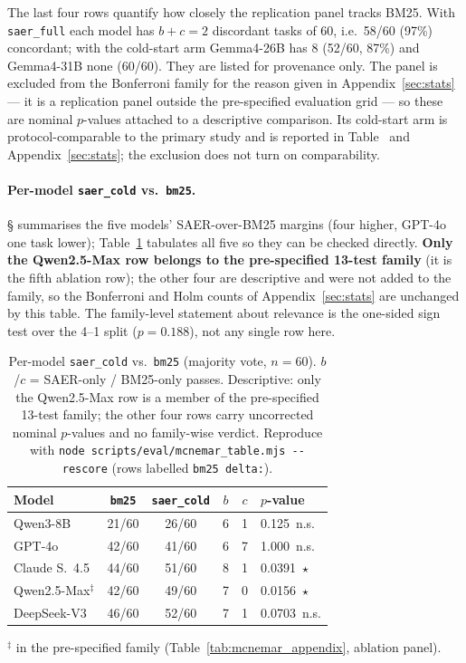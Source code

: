 \documentclass[letterpaper]{article} %
\newcommand{\appref}[1]{Appendix~\ref{#1}}
\newcommand{\bodyref}[1]{\getrefnumber{#1}}
\begin{document}
The last four rows quantify how closely the replication panel tracks
BM25.  With \texttt{saer\_full} each model has $b{+}c{=}2$ discordant
tasks of 60, i.e.\ 58/60 (97\%) concordant; with the cold-start arm
Gemma4-26B has 8 (52/60, 87\%) and Gemma4-31B none (60/60).
They are listed for provenance only.  The panel is excluded from the
Bonferroni family for the reason given in \appref{sec:stats} --- it is a
replication panel outside the pre-specified evaluation grid --- so these
are nominal $p$-values attached to a descriptive comparison.  Its
cold-start arm is protocol-comparable to the primary study and is
reported in Table~\bodyref{tab:main} and \appref{sec:stats}; the exclusion
does not turn on comparability.

\paragraph{Per-model \texttt{saer\_cold} vs.\ \texttt{bm25}.}
\S\bodyref{sec:ablation} summarises the five models' SAER-over-BM25 margins
(four higher, GPT-4o one task lower); Table~\ref{tab:bm25_permodel} tabulates all five so they can be
checked directly.  \textbf{Only the Qwen2.5-Max row belongs to the
pre-specified 13-test family} (it is the fifth ablation row); the other
four are descriptive and were not added to the family, so the Bonferroni
and Holm counts of \appref{sec:stats} are unchanged by this table.  The
family-level statement about relevance is the one-sided sign test over
the 4--1 split ($p{=}0.188$), not any single row here.

\begin{table}[tbp]
\centering
\caption{Per-model \texttt{saer\_cold} vs.\ \texttt{bm25} (majority vote,
$n{=}60$).  $b$/$c$ = SAER-only / BM25-only passes.  Descriptive:
only the Qwen2.5-Max row is a member of the pre-specified 13-test family;
the other four rows carry uncorrected nominal $p$-values and no
family-wise verdict.  Reproduce with
\texttt{node scripts/\allowbreak eval/\allowbreak mcnemar\_table.mjs -{}-rescore}
(rows labelled \texttt{bm25 delta:}).}
\label{tab:bm25_permodel}
\small
\begin{tabular}{@{}lccccl@{}}
\toprule
Model & \texttt{bm25} & \texttt{saer\_cold} & $b$ & $c$ & $p$-value \\
\midrule
Qwen3-8B                   & 21/60 & 26/60 & 6 & 1 & 0.125~n.s. \\
GPT-4o                     & 42/60 & 41/60 & 6 & 7 & 1.000~n.s. \\
Claude S.~4.5              & 44/60 & 51/60 & 8 & 1 & 0.0391~$\star$ \\
Qwen2.5-Max$^{\ddagger}$   & 42/60 & 49/60 & 7 & 0 & 0.0156~$\star$ \\
DeepSeek-V3                & 46/60 & 52/60 & 7 & 1 & 0.0703~n.s. \\
\bottomrule
\end{tabular}

\vspace{2pt}
{\footnotesize $^{\ddagger}$ in the pre-specified family
(Table~\ref{tab:mcnemar_appendix}, ablation panel).}
\end{table}
\end{document}
